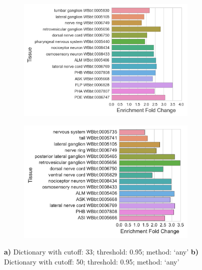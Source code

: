 \documentclass[linenumbers, doublespacing]{bmcart}
\begin{document}
\begin{backmatter}
\begin{figure}
  \begin{subfigure}[b]{0.95\textwidth}
    \includegraphics[width=0.95\textwidth]{WBPaper00031532_Larva_Pan_Neuronal_Enriched_WBbt_0003679_1603_33cutoff.png}
    \caption{}
    \label{fig:PanNeuronalWatson33}
  \end{subfigure}
  \begin{subfigure}[b]{0.95\textwidth}
    \includegraphics[width=0.95\textwidth]{WBPaper00031532_Larva_Pan_Neuronal_Enriched_WBbt_0003679_1603_50cutoff}
    \caption{}
    \label{fig:PanNeuronalWatson50}
  \end{subfigure}
  \captionsetup{width= 0.95\textwidth}
  \caption{
   \textbf{a)} Dictionary with cutoff: 33; threshold: 0.95; method: `any'
   \textbf{b)} Dictionary with cutoff: 50; threshold: 0.95; method: `any'
   }
   \label{fig:interagree}
\end{figure}


\end{backmatter}
\end{document}
